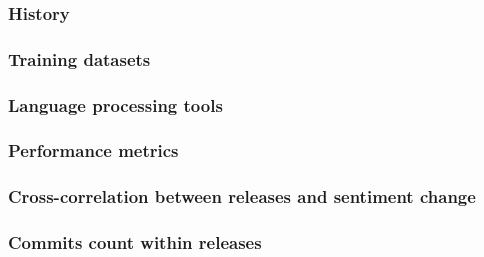 \subsubsection{History}


\subsubsection{Training datasets}


\subsubsection{Language processing tools}


\subsubsection{Performance metrics}



\subsubsection{Cross-correlation between releases and sentiment change}


\subsubsection{Commits count within releases}

